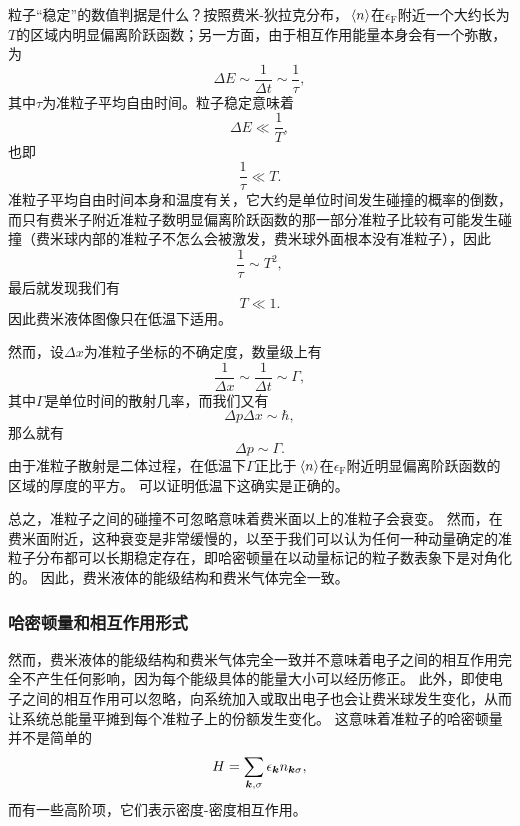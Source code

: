 粒子“稳定”的数值判据是什么？按照费米-狄拉克分布，$\expval*{{n}}$在$\epsilon_\text{F}$附近一个大约长为$T$的区域内明显偏离阶跃函数；另一方面，由于相互作用能量本身会有一个弥散，为
\[
    \Delta E \sim \frac{1}{\Delta t} \sim \frac{1}{\tau},
\]
其中$\tau$为准粒子平均自由时间。粒子稳定意味着
\[
    \Delta E \ll \frac{1}{T},
\]
也即
\[
    \frac{1}{\tau} \ll T.
\]
准粒子平均自由时间本身和温度有关，它大约是单位时间发生碰撞的概率的倒数，而只有费米子附近准粒子数明显偏离阶跃函数的那一部分准粒子比较有可能发生碰撞（费米球内部的准粒子不怎么会被激发，费米球外面根本没有准粒子），因此
\[
    \frac{1}{\tau} \sim T^2,
\]
最后就发现我们有
\[
    T \ll 1.
\]
因此费米液体图像只在低温下适用。

然而，设$\Delta x$为准粒子坐标的不确定度，数量级上有
\[
    \frac{1}{\Delta x} \sim \frac{1}{\Delta t} \sim \Gamma,
\]
其中$\Gamma$是单位时间的散射几率，而我们又有
\[
    \Delta p \Delta x \sim \hbar,
\]
那么就有
\[
    \Delta p \sim \Gamma.
\]
由于准粒子散射是二体过程，在低温下$\Gamma$正比于$\expval*{{n}}$在$\epsilon_\text{F}$附近明显偏离阶跃函数的区域的厚度的平方。
可以证明低温下这确实是正确的。

总之，准粒子之间的碰撞不可忽略意味着费米面以上的准粒子会衰变。
然而，在费米面附近，这种衰变是非常缓慢的，以至于我们可以认为任何一种动量确定的准粒子分布都可以长期稳定存在，即哈密顿量在以动量标记的粒子数表象下是对角化的。
因此，费米液体的能级结构和费米气体完全一致。

\subsubsection{哈密顿量和相互作用形式}

然而，费米液体的能级结构和费米气体完全一致并不意味着电子之间的相互作用完全不产生任何影响，因为每个能级具体的能量大小可以经历修正。
此外，即使电子之间的相互作用可以忽略，向系统加入或取出电子也会让费米球发生变化，从而让系统总能量平摊到每个准粒子上的份额发生变化。
这意味着准粒子的哈密顿量并不是简单的
\[
    H = \sum_{\vb*{k}, \sigma} \epsilon_{\vb*{k}} n_{\vb*{k} \sigma},
\]
而有一些高阶项，它们表示密度-密度相互作用。

